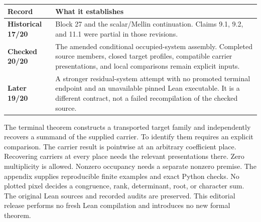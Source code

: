 \begin{tabularx}{\linewidth}{@{}p{.22\linewidth}Y@{}}\toprule
Record & What it establishes\\\midrule
\textbf{Historical 17/20} & Block 27 and the scalar/Mellin continuation. Claims 9.1, 9.2, and 11.1 were partial in those revisions.\\
\textbf{Checked 20/20} & The amended conditional occupied-system assembly. Completed source members, closed target profiles, compatible carrier presentations, and local comparisons remain explicit inputs.\\
\textbf{Later 19/20} & A stronger residual-system attempt with no promoted terminal endpoint and an unavailable pinned Lean executable. It is a different contract, not a failed recompilation of the checked source.\\\bottomrule
\end{tabularx}
The terminal theorem constructs a transported target family and independently
recovers a summand of the supplied carrier. To identify them requires an explicit
comparison. The carrier result is pointwise at an arbitrary coefficient place.
Recovering carriers at every place needs the relevant presentations there.
Zero multiplicity is allowed. Nonzero occupancy needs a separate nonzero premise.
The appendix supplies reproducible finite examples and exact Python checks.
No plotted pixel decides a congruence, rank, determinant, root, or character sum.
The original Lean sources and recorded audits are preserved. This editorial
release performs no fresh Lean compilation and introduces no new formal theorem.
